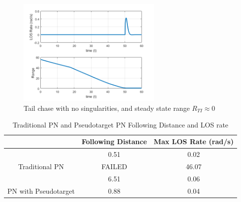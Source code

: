 \documentclass[conference]{IEEEtran}
\providecommand{\DIFdelbegin}{} %
\providecommand{\DIFdelend}{} %
\newcommand{\DIFscaledelfig}{0.5}
\newlength{\DIFdelgraphicswidth} %
\newlength{\DIFdelgraphicsheight} %
\newcommand{\DIFdelincludegraphics}[2][]{%
\sbox{\DIFdelgraphicsbox}{\DIFOincludegraphics[#1]{#2}}%
\settoboxwidth{\DIFdelgraphicswidth}{\DIFdelgraphicsbox} %
\settoboxtotalheight{\DIFdelgraphicsheight}{\DIFdelgraphicsbox} %
\scalebox{\DIFscaledelfig}{%
\parbox[b]{\DIFdelgraphicswidth}{\usebox{\DIFdelgraphicsbox}\\[-\baselineskip] \rule{\DIFdelgraphicswidth}{0em}}\llap{\resizebox{\DIFdelgraphicswidth}{\DIFdelgraphicsheight}{%
\setlength{\unitlength}{\DIFdelgraphicswidth}%
\begin{picture}(1,1)%
\thicklines\linethickness{2pt} %
{\color[rgb]{1,0,0}\put(0,0){\framebox(1,1){}}}%
{\color[rgb]{1,0,0}\put(0,0){\line( 1,1){1}}}%
{\color[rgb]{1,0,0}\put(0,1){\line(1,-1){1}}}%
\end{picture}%
}\hspace*{3pt}}} %
} %
\DeclareRobustCommand{\DIFdelbegin}{\DIFOdelbegin \let\includegraphics\DIFdelincludegraphics} %
\DeclareRobustCommand{\DIFdelend}{\DIFOaddend \let\includegraphics\DIFOincludegraphics} %
\begin{document}
\begin{figure}[H]
	\centering
	\includegraphics[width=7cm] {ptx50_range_LOSrate}
	\caption{Tail chase with no singularities, and steady state range $R_{TI}\approx0$}
	\label{fig:modifiedPNsuccessLOS}
	\hspace*{0mm}
\end{figure}



\DIFdelbegin %

\DIFdelend \begin{table}[H]
	\centering
	\caption{Traditional PN and Pseudotarget PN Following Distance and LOS rate}
	\label{my-label}
	\begin{tabular}{c|c|c|}
		\cline{2-3}
		\multicolumn{1}{l|}{}                                        & \multicolumn{1}{l|}{Following Distance} & \multicolumn{1}{l|}{Max LOS Rate (rad/s)} \\ \hline
		\multicolumn{1}{|c|}{}                                       & 0.51                                    & 0.02                                      \\ \cline{2-3} 
		\multicolumn{1}{|c|}{\multirow{-2}{*}{Traditional PN}}       & \cellcolor[HTML]{C0C0C0} FAILED         & 46.07                                     \\ \hline
		\multicolumn{1}{|c|}{}                                       & 6.51                                    & 0.06                                      \\ \cline{2-3} 
		\multicolumn{1}{|c|}{\multirow{-2}{*}{PN with Pseudotarget}} & 0.88                                    & 0.04                                      \\ \hline
	\end{tabular}
\end{table}
\end{document}
